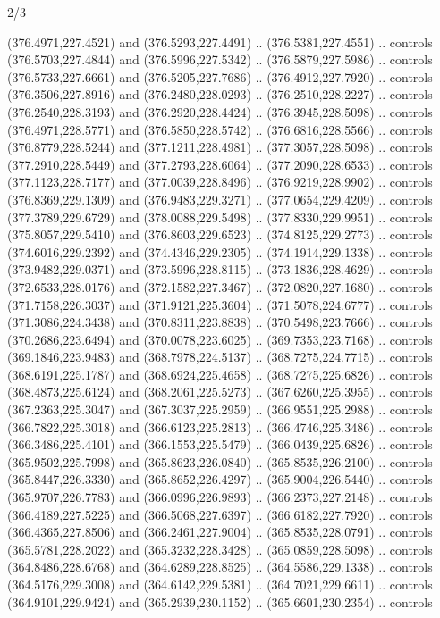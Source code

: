 \begin{flagdescription}{2/3}
\begin{scope}[xshift=0.5\flaglength,yshift=0.5\flagwidth,scale=\flagwidth/495.65]
\begin{scope}[y=0.8pt, x=0.8pt, yscale=-1,shift={(-463.76,-309.78)}]
  (376.4971,227.4521) and (376.5293,227.4491) .. (376.5381,227.4551) .. controls
  (376.5703,227.4844) and (376.5996,227.5342) .. (376.5879,227.5986) .. controls
  (376.5733,227.6661) and (376.5205,227.7686) .. (376.4912,227.7920) .. controls
  (376.3506,227.8916) and (376.2480,228.0293) .. (376.2510,228.2227) .. controls
  (376.2540,228.3193) and (376.2920,228.4424) .. (376.3945,228.5098) .. controls
  (376.4971,228.5771) and (376.5850,228.5742) .. (376.6816,228.5566) .. controls
  (376.8779,228.5244) and (377.1211,228.4981) .. (377.3057,228.5098) .. controls
  (377.2910,228.5449) and (377.2793,228.6064) .. (377.2090,228.6533) .. controls
  (377.1123,228.7177) and (377.0039,228.8496) .. (376.9219,228.9902) .. controls
  (376.8369,229.1309) and (376.9483,229.3271) .. (377.0654,229.4209) .. controls
  (377.3789,229.6729) and (378.0088,229.5498) .. (377.8330,229.9951) .. controls
  (375.8057,229.5410) and (376.8603,229.6523) .. (374.8125,229.2773) .. controls
  (374.6016,229.2392) and (374.4346,229.2305) .. (374.1914,229.1338) .. controls
  (373.9482,229.0371) and (373.5996,228.8115) .. (373.1836,228.4629) .. controls
  (372.6533,228.0176) and (372.1582,227.3467) .. (372.0820,227.1680) .. controls
  (371.7158,226.3037) and (371.9121,225.3604) .. (371.5078,224.6777) .. controls
  (371.3086,224.3438) and (370.8311,223.8838) .. (370.5498,223.7666) .. controls
  (370.2686,223.6494) and (370.0078,223.6025) .. (369.7353,223.7168) .. controls
  (369.1846,223.9483) and (368.7978,224.5137) .. (368.7275,224.7715) .. controls
  (368.6191,225.1787) and (368.6924,225.4658) .. (368.7275,225.6826) .. controls
  (368.4873,225.6124) and (368.2061,225.5273) .. (367.6260,225.3955) .. controls
  (367.2363,225.3047) and (367.3037,225.2959) .. (366.9551,225.2988) .. controls
  (366.7822,225.3018) and (366.6123,225.2813) .. (366.4746,225.3486) .. controls
  (366.3486,225.4101) and (366.1553,225.5479) .. (366.0439,225.6826) .. controls
  (365.9502,225.7998) and (365.8623,226.0840) .. (365.8535,226.2100) .. controls
  (365.8447,226.3330) and (365.8652,226.4297) .. (365.9004,226.5440) .. controls
  (365.9707,226.7783) and (366.0996,226.9893) .. (366.2373,227.2148) .. controls
  (366.4189,227.5225) and (366.5068,227.6397) .. (366.6182,227.7920) .. controls
  (366.4365,227.8506) and (366.2461,227.9004) .. (365.8535,228.0791) .. controls
  (365.5781,228.2022) and (365.3232,228.3428) .. (365.0859,228.5098) .. controls
  (364.8486,228.6768) and (364.6289,228.8525) .. (364.5586,229.1338) .. controls
  (364.5176,229.3008) and (364.6142,229.5381) .. (364.7021,229.6611) .. controls
  (364.9101,229.9424) and (365.2939,230.1152) .. (365.6601,230.2354) .. controls

\end{scope}
\end{scope}
\end{flagdescription}
